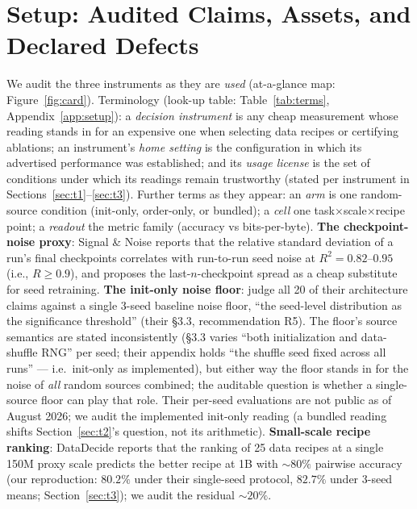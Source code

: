 
\section{Setup: Audited Claims, Assets, and Declared Defects}
\label{sec:setup}

We audit the three instruments as they are \emph{used} (at-a-glance map: Figure~\ref{fig:card}). Terminology (look-up table:
Table~\ref{tab:terms}, Appendix~\ref{app:setup}): a \emph{decision
instrument} is any cheap measurement whose reading stands in for an expensive one when
selecting data recipes or certifying ablations; an instrument's \emph{home setting} is the
configuration in which its advertised performance was established; and its \emph{usage
license} is the set of conditions under which its readings remain trustworthy (stated per
instrument in Sections~\ref{sec:t1}--\ref{sec:t3}). Further terms as they appear: an
\emph{arm} is one random-source condition (init-only, order-only, or bundled); a \emph{cell}
one task$\times$scale$\times$recipe point; a \emph{readout} the metric family (accuracy vs
bits-per-byte). \textbf{The checkpoint-noise proxy}: Signal \&
Noise \citep{signalandnoise2025} reports that the relative standard deviation of a run's final
checkpoints correlates with run-to-run seed noise at $R^2 = 0.82$--$0.95$ (i.e., $R \ge 0.9$),
and proposes the last-$n$-checkpoint spread as a cheap substitute for seed retraining.
\textbf{The init-only noise floor}: \citet{tencent2026} judge all 20 of their architecture claims
against a single 3-seed baseline noise floor, ``the seed-level distribution as the significance
threshold'' (their \S3.3, recommendation R5). The floor's source semantics are stated
inconsistently (\S3.3 varies ``both initialization and data-shuffle RNG'' per seed; their
appendix holds ``the shuffle seed fixed across all runs'' --- i.e.\ init-only as implemented), but either way the floor stands in
for the noise of \emph{all} random sources combined;
the auditable question is whether a single-source floor can play that role. Their per-seed
evaluations are not public as of August 2026; we audit the implemented init-only reading
(a bundled reading shifts Section~\ref{sec:t2}'s question, not its arithmetic).
\textbf{Small-scale
recipe ranking}: DataDecide \citep{datadecide2025} reports that the
ranking of 25 data recipes at a single 150M proxy scale predicts the better recipe at 1B with ${\sim}80\%$ pairwise accuracy (our reproduction: $80.2\%$ under their single-seed protocol, $82.7\%$ under 3-seed means; Section~\ref{sec:t3}); we audit the residual ${\sim}20\%$.

